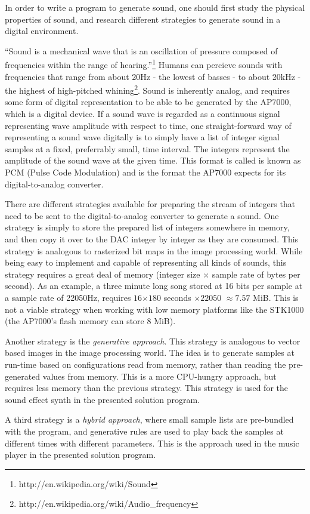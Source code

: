 In order to write a program to generate sound, one should first study the physical properties of sound, and research different strategies to generate sound in a digital environment.

``Sound is a mechanical wave that is an oscillation of pressure composed of frequencies within the range of hearing.''\footnote{http://en.wikipedia.org/wiki/Sound} Humans can percieve sounds with frequencies that range from about 20Hz - the lowest of basses - to about 20kHz - the highest of high-pitched whining\footnote{http://en.wikipedia.org/wiki/Audio_frequency}.
Sound is inherently analog, and requires some form of digital representation to be able to be generated by the AP7000, which is a digital device.
If a sound wave is regarded as a continuous signal representing wave amplitude with respect to time, one straight-forward way of representing a sound wave digitally is to simply have a list of integer signal samples at a fixed, preferrably small, time interval.
The integers represent the amplitude of the sound wave at the given time.
This format is called is known as PCM (Pulse Code Modulation) and is the format the AP7000 expects for its digital-to-analog converter.

There are different strategies available for preparing the stream of integers that need to be sent to the digital-to-analog converter to generate a sound.
One strategy is simply to store the prepared list of integers somewhere in memory, and then copy it over to the DAC integer by integer as they are consumed.
This strategy is analogous to rasterized bit maps in the image processing world.
While being easy to implement and capable of representing all kinds of sounds, this strategy requires a great deal of memory (integer size $\times$ sample rate of bytes per second).
As an example, a three minute long song stored at 16 bits per sample at a sample rate of 22050Hz, requires $16$$\times 180$ seconds $\times 22050$  $\approx 7.57$ MiB.
This is not a viable strategy when working with low memory platforms like the STK1000 (the AP7000's flash memory can store 8 MiB).

Another strategy is the \emph{generative approach}.
This strategy is analogous to vector based images in the image processing world.
The idea is to generate samples at run-time based on configurations read from memory, rather than reading the pre-generated values from memory.
This is a more CPU-hungry approach, but requires less memory than the previous strategy.
This strategy is used for the sound effect synth in the presented solution program.

A third strategy is a \emph{hybrid approach}, where small sample lists are pre-bundled with the program, and generative rules are used to play back the samples at different times with different parameters.
This is the approach used in the music player in the presented solution program.
